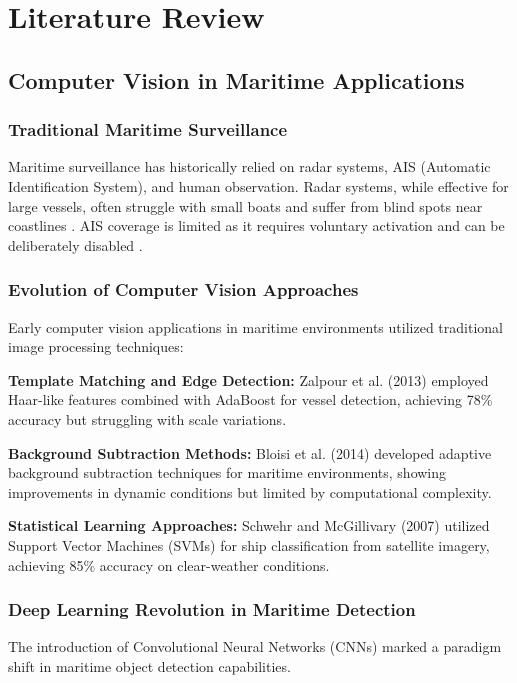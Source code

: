 \documentclass[12pt,a4paper]{report}
\begin{document}
\chapter{Literature Review}

\section{Computer Vision in Maritime Applications}

\subsection{Traditional Maritime Surveillance}
Maritime surveillance has historically relied on radar systems, AIS (Automatic Identification System), and human observation. Radar systems, while effective for large vessels, often struggle with small boats and suffer from blind spots near coastlines \cite{greidanus2006detection}. AIS coverage is limited as it requires voluntary activation and can be deliberately disabled \cite{iphar2020data}.

\subsection{Evolution of Computer Vision Approaches}
Early computer vision applications in maritime environments utilized traditional image processing techniques:

\textbf{Template Matching and Edge Detection:} Zalpour et al. (2013) \cite{zalpour2013vessel} employed Haar-like features combined with AdaBoost for vessel detection, achieving 78\% accuracy but struggling with scale variations.

\textbf{Background Subtraction Methods:} Bloisi et al. (2014) \cite{bloisi2014background} developed adaptive background subtraction techniques for maritime environments, showing improvements in dynamic conditions but limited by computational complexity.

\textbf{Statistical Learning Approaches:} Schwehr and McGillivary (2007) \cite{schwehr2007marine} utilized Support Vector Machines (SVMs) for ship classification from satellite imagery, achieving 85\% accuracy on clear-weather conditions.

\subsection{Deep Learning Revolution in Maritime Detection}
The introduction of Convolutional Neural Networks (CNNs) marked a paradigm shift in maritime object detection capabilities.
\end{document}

